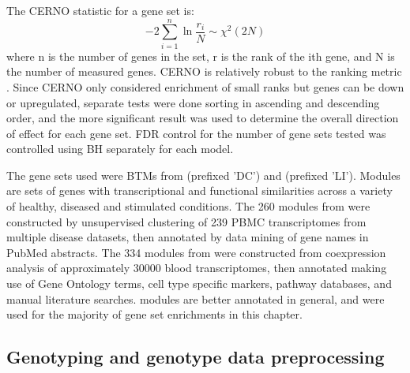 The CERNO statistic for a gene set is:
\begin{equation}
    -2 \sum_{i=1}^{n} \ln \frac{r_i}{N} \sim \chi^2(2N)
\end{equation}
where n is the number of genes in the set,
r is the rank of the ith gene,
and N is the number of measured genes.
CERNO is relatively robust to the ranking metric \autocite{zyla2019GeneSetEnrichment}.
Since CERNO only considered enrichment of small ranks but genes can be down or upregulated, 
separate tests were done sorting in ascending and descending order,
and the more significant result was used to determine the overall direction of effect for each gene set.
\gls{FDR} control for the number of gene sets tested was controlled using \gls{BH} separately for each model.

The gene sets used were \glspl{BTM} from \textcite{chaussabel2008ModularAnalysisFramework} (prefixed 'DC') and \textcite{li2013MolecularSignaturesAntibody} (prefixed 'LI').
Modules are sets of genes with transcriptional and functional similarities across a variety of healthy, diseased and stimulated conditions.
The 260 modules from \textcite{chaussabel2008ModularAnalysisFramework} were constructed by unsupervised clustering of 239 \gls{PBMC} transcriptomes from multiple disease datasets,
then annotated by data mining of gene names in PubMed abstracts.
The 334 modules from \textcite{li2013MolecularSignaturesAntibody} were constructed from coexpression analysis of approximately \num{30000} blood transcriptomes,
then annotated making use of Gene Ontology terms, cell type specific markers, pathway databases, and manual literature searches.
\textcite{li2013MolecularSignaturesAntibody} modules are better annotated in general, and were used for the majority of gene set enrichments in this chapter.


\subsection{Genotyping and genotype data preprocessing}

